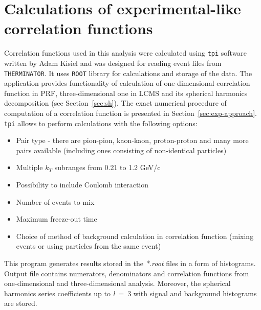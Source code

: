   \section{Calculations of experimental-like correlation functions}
    Correlation functions used in this analysis were calculated using \verb|tpi| software written by Adam Kisiel and was designed for reading event files from \verb|THERMINATOR|.
    It uses \verb|ROOT| library for calculations and storage of the data.
    The application provides functionality of calculation of one-dimensional correlation function in PRF, three-dimensional one in LCMS and its spherical harmonics decomposition (see Section~\ref{sec:sh}).
    The exact numerical procedure of computation of a correlation function is presented in Section~\ref{sec:exp-approach}.
    \verb|tpi| allows to perform calculations with the following options:
    \begin{itemize}
      \item Pair type - there are pion-pion, kaon-kaon, proton-proton and many more pairs available (including ones consisting of non-identical particles)
      \item Multiple $k_T$ subranges from 0.21 to 1.2 GeV/c
      \item Possibility to include Coulomb interaction
      \item Number of events to mix
      \item Maximum freeze-out time
      \item Choice of method of background calculation in correlation function (mixing events or using particles from the same event)
    \end{itemize}
    This program generates results stored in the \textit{*.root} files in a form of histograms.
    Output file contains numerators, denominators and correlation functions from one-dimensional and three-dimensional analysis.
    Moreover, the spherical harmonics series coefficients up to \textit{l}~=~3 with signal and background histograms are stored.

